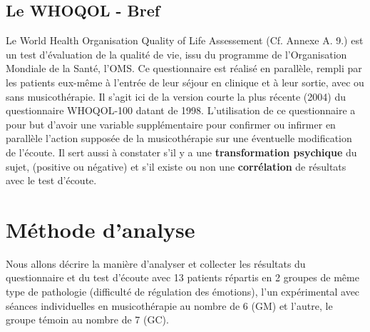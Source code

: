 \subsection* {Le WHOQOL  - Bref}  
Le World Health 	Organisation Quality of Life Assessement  (Cf. Annexe A. 9.) 
est un test d'évaluation de la qualité de vie, issu du
programme de l'Organisation Mondiale de la Santé, l'OMS.
Ce questionnaire est réalisé en parallèle, rempli par
les patients eux-même à l'entrée de leur séjour en clinique et
à leur sortie, avec ou sans musicothérapie.
Il s'agit ici de la version courte  la plus récente (2004) du questionnaire
WHOQOL-100 datant de 1998.
L'utilisation de ce questionnaire a pour but d'avoir
une variable supplémentaire pour confirmer ou infirmer en
parallèle l'action supposée  de la musicothérapie sur une éventuelle
modification de l'écoute.
Il sert aussi à constater s'il y a une\textbf{ transformation psychique }du sujet,
(positive ou négative) et s'il existe ou non une \textbf{corrélation }de
résultats avec le test d'écoute.

\section{Méthode d'analyse}
Nous allons décrire la manière d'analyser et collecter les résultats du questionnaire et du test d'écoute 
avec 13 patients répartis en 2 groupes de même type de pathologie (difficulté de régulation des 
émotions), l'un expérimental avec séances individuelles en musicothérapie au nombre de 6 (GM) et 
l'autre, le groupe témoin au 
nombre 
de 7 (GC).
